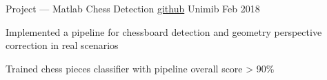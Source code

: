 \begin{cventries}
  \cventry
  {Project --- Matlab}
  {Chess Detection \tiny \href{https://github.com/gianscarpe/chess_detection}{github}}
  {Unimib}
  {Feb 2018}
  {
    \begin{cvitems} %
    \item Implemented a pipeline for chessboard detection and geometry perspective correction in real scenarios 
    \item Trained chess pieces classifier with pipeline overall score > 90\%
    \end{cvitems}
  }



  
\end{cventries}



